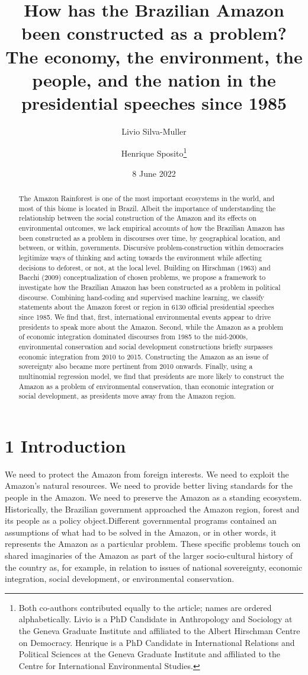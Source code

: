 \documentclass[
]{article}
\title{How has the Brazilian Amazon been constructed as a problem? The
economy, the environment, the people, and the nation in the presidential
speeches since 1985}
\author{Livio Silva-Muller \and Henrique Sposito\footnote{Both
  co-authors contributed equally to the article; names are ordered
  alphabetically. Livio is a PhD Candidate in Anthropology and Sociology
  at the Geneva Graduate Institute and affiliated to the Albert
  Hirschman Centre on Democracy. Henrique is a PhD Candidate in
  International Relations and Political Sciences at the Geneva Graduate
  Institute and affiliated to the Centre for International Environmental
  Studies.}}
\date{8 June 2022}
\begin{document}
\maketitle
\begin{abstract}
The Amazon Rainforest is one of the most important ecosystems in the
world, and most of this biome is located in Brazil. Albeit the
importance of understanding the relationship between the social
construction of the Amazon and its effects on environmental outcomes, we
lack empirical accounts of how the Brazilian Amazon has been constructed
as a problem in discourses over time, by geographical location, and
between, or within, governments. Discursive problem-construction within
democracies legitimize ways of thinking and acting towards the
environment while affecting decisions to deforest, or not, at the local
level. Building on Hirschman (1963) and Bacchi (2009) conceptualization
of chosen problems, we propose a framework to investigate how the
Brazilian Amazon has been constructed as a problem in political
discourse. Combining hand-coding and supervised machine learning, we
classify statements about the Amazon forest or region in 6130 official
presidential speeches since 1985. We find that, first, international
environmental events appear to drive presidents to speak more about the
Amazon. Second, while the Amazon as a problem of economic integration
dominated discourses from 1985 to the mid-2000s, environmental
conservation and social development constructions briefly surpasses
economic integration from 2010 to 2015. Constructing the Amazon as an
issue of sovereignty also became more pertinent from 2010 onwards.
Finally, using a multinomial regression model, we find that presidents
are more likely to construct the Amazon as a problem of environmental
conservation, than economic integration or social development, as
presidents move away from the Amazon region.
\end{abstract}

\pagebreak

\hypertarget{introduction}{%
\section{1 Introduction}\label{introduction}}

We need to protect the Amazon from foreign interests. We need to exploit
the Amazon's natural resources. We need to provide better living
standards for the people in the Amazon. We need to preserve the Amazon
as a standing ecosystem. Historically, the Brazilian government
approached the Amazon region, forest and its people as a policy
object.Different governmental programs contained an assumptions of what
had to be solved in the Amazon, or in other words, it represents the
Amazon as a particular problem. These specific problems touch on shared
imaginaries of the Amazon as part of the larger socio-cultural history
of the country as, for example, in relation to issues of national
sovereignty, economic integration, social development, or environmental
conservation.
\end{document}
